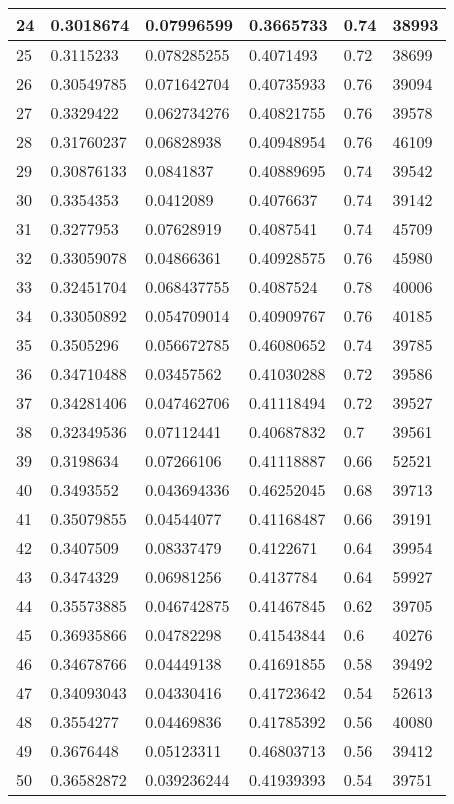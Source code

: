 \begin{longtable}{|l|l|l|l|l|l|}
24 & 0.3018674 & 0.07996599 & 0.3665733 & 0.74 & 38993 \\ \hline 
25 & 0.3115233 & 0.078285255 & 0.4071493 & 0.72 & 38699 \\ \hline 
26 & 0.30549785 & 0.071642704 & 0.40735933 & 0.76 & 39094 \\ \hline 
27 & 0.3329422 & 0.062734276 & 0.40821755 & 0.76 & 39578 \\ \hline 
28 & 0.31760237 & 0.06828938 & 0.40948954 & 0.76 & 46109 \\ \hline 
29 & 0.30876133 & 0.0841837 & 0.40889695 & 0.74 & 39542 \\ \hline 
30 & 0.3354353 & 0.0412089 & 0.4076637 & 0.74 & 39142 \\ \hline 
31 & 0.3277953 & 0.07628919 & 0.4087541 & 0.74 & 45709 \\ \hline 
32 & 0.33059078 & 0.04866361 & 0.40928575 & 0.76 & 45980 \\ \hline 
33 & 0.32451704 & 0.068437755 & 0.4087524 & 0.78 & 40006 \\ \hline 
34 & 0.33050892 & 0.054709014 & 0.40909767 & 0.76 & 40185 \\ \hline 
35 & 0.3505296 & 0.056672785 & 0.46080652 & 0.74 & 39785 \\ \hline 
36 & 0.34710488 & 0.03457562 & 0.41030288 & 0.72 & 39586 \\ \hline 
37 & 0.34281406 & 0.047462706 & 0.41118494 & 0.72 & 39527 \\ \hline 
38 & 0.32349536 & 0.07112441 & 0.40687832 & 0.7 & 39561 \\ \hline 
39 & 0.3198634 & 0.07266106 & 0.41118887 & 0.66 & 52521 \\ \hline 
40 & 0.3493552 & 0.043694336 & 0.46252045 & 0.68 & 39713 \\ \hline 
41 & 0.35079855 & 0.04544077 & 0.41168487 & 0.66 & 39191 \\ \hline 
42 & 0.3407509 & 0.08337479 & 0.4122671 & 0.64 & 39954 \\ \hline 
43 & 0.3474329 & 0.06981256 & 0.4137784 & 0.64 & 59927 \\ \hline 
44 & 0.35573885 & 0.046742875 & 0.41467845 & 0.62 & 39705 \\ \hline 
45 & 0.36935866 & 0.04782298 & 0.41543844 & 0.6 & 40276 \\ \hline 
46 & 0.34678766 & 0.04449138 & 0.41691855 & 0.58 & 39492 \\ \hline 
47 & 0.34093043 & 0.04330416 & 0.41723642 & 0.54 & 52613 \\ \hline 
48 & 0.3554277 & 0.04469836 & 0.41785392 & 0.56 & 40080 \\ \hline 
49 & 0.3676448 & 0.05123311 & 0.46803713 & 0.56 & 39412 \\ \hline 
50 & 0.36582872 & 0.039236244 & 0.41939393 & 0.54 & 39751 \\ \hline 
\end{longtable}